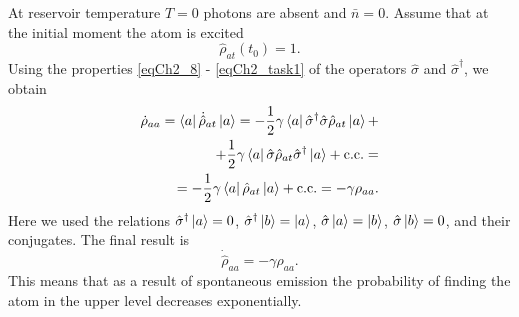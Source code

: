 At reservoir temperature $T = 0$  photons are absent and $\bar{n} =
0$.  Assume that at the initial moment the atom is excited 
\[
\hat{\rho}_{at}\left(t_0\right) = 1.
\]
Using the properties \eqref{eqCh2_8} - \eqref{eqCh2_task1} of the operators 
$\hat{\sigma}$ and $\hat{\sigma}^{\dag}$, we obtain   
\begin{eqnarray}
\dot{\rho}_{aa} = \bra{a}\dot{\hat{\rho}}_{at}\ket{a} =
-\frac{1}{2}\gamma
\bra{a}\hat{\sigma}^{\dag}\hat{\sigma}\hat{\rho}_{at}\ket{a}
+ 
\nonumber \\
+ \frac{1}{2}\gamma
\bra{a}\hat{\sigma}\hat{\rho}_{at}\hat{\sigma}^{\dag}\ket{a}
+ \mbox{c.c.} = 
\nonumber \\
= 
- \frac{1}{2}\gamma
\bra{a}\hat{\rho}_{at}\ket{a} + \mbox{c.c.} = 
- \gamma \rho_{aa}.
\label{eqCh2_101}
\end{eqnarray}
Here we used the relations
\(\hat{\sigma}^{\dag}\ket{a} = 0\),
\(\hat{\sigma}^{\dag}\ket{b} = \ket{a}\),
\(\hat{\sigma}\ket{a} = \ket{b}\),
\(\hat{\sigma}\ket{b} = 0\),
and their conjugates. The final result is 
\begin{equation}
\dot{\hat{\rho}}_{aa} = - \gamma \rho_{aa}.
\label{eqCh2_102}
\end{equation}
This means that as a result of spontaneous emission the probability
of finding the atom in the upper level decreases exponentially. 
